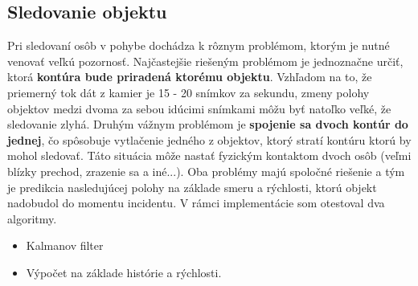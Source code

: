 \subsection{Sledovanie objektu}
Pri sledovaní osôb v pohybe dochádza k rôznym problémom, ktorým je nutné venovať veľkú pozornosť. Najčastejšie riešeným problémom je jednoznačne určiť, ktorá \textbf{kontúra bude priradená ktorému objektu}. Vzhľadom na to, že priemerný tok dát z kamier je 15 - 20 snímkov za sekundu, zmeny polohy objektov medzi dvoma za sebou idúcimi snímkami môžu byť natoľko veľké, že sledovanie zlyhá. Druhým vážnym problémom je \textbf{spojenie sa dvoch kontúr do jednej}, čo spôsobuje vytlačenie jedného z objektov, ktorý stratí kontúru ktorú by mohol sledovať. Táto situácia môže nastať fyzickým kontaktom dvoch osôb (veľmi blízky prechod, zrazenie sa a iné...). Oba problémy majú spoločné riešenie a tým je predikcia nasledujúcej polohy na základe smeru a rýchlosti, ktorú objekt nadobudol do momentu incidentu.
V rámci implementácie som otestoval dva algoritmy.
\begin{itemize}
\item Kalmanov filter
\item Výpočet na základe histórie a rýchlosti. 
\end{itemize}


